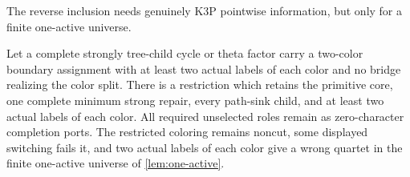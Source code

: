 The reverse inclusion needs genuinely K3P pointwise information, but only for
a finite one-active universe.

\begin{lemma}\label{lem:balanced-compression}
Let a complete strongly tree-child cycle or theta factor carry a two-color
boundary assignment with at least two actual labels of each color and no
bridge realizing the color split.  There is a restriction which retains the
primitive core, one complete minimum strong repair, every path-sink child,
and at least two actual labels of each color.  All required unselected roles
remain as zero-character completion ports.  The restricted coloring remains
noncut, some displayed switching fails it, and two actual labels of each
color give a wrong quartet in the finite one-active universe of
\cref{lem:one-active}.
\end{lemma}

